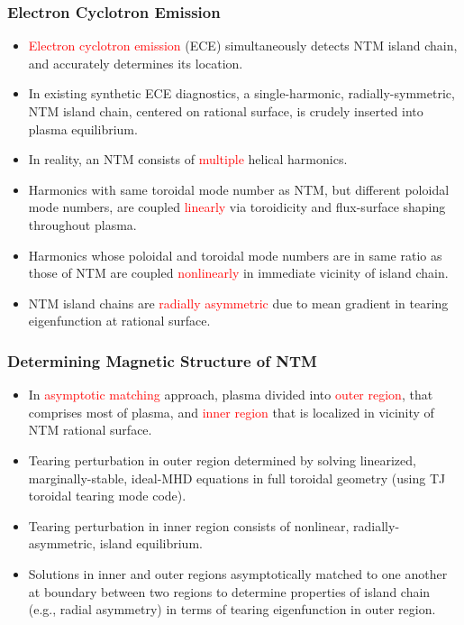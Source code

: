 \documentclass{beamer}
\begin{document}
\begin{frame}
\frametitle{Electron Cyclotron Emission}
 
\begin{itemize}
\item \textcolor{red}{Electron cyclotron emission} (ECE) simultaneously  detects  NTM island chain, and
accurately determines its location. 
\item In existing synthetic ECE diagnostics,  a single-harmonic, radially-symmetric, NTM island chain, centered on 
rational surface, is
crudely inserted into plasma equilibrium. 
\item In reality, an NTM consists of \textcolor{red}{multiple} helical harmonics. 
\item Harmonics with  same toroidal mode number as  NTM, but different poloidal mode numbers, are
coupled \textcolor{red}{linearly} via toroidicity and flux-surface shaping throughout  plasma. 
\item Harmonics whose poloidal and toroidal mode numbers are in  same ratio as those of  NTM are coupled \textcolor{red}{nonlinearly} in  immediate vicinity of island chain. 
\item NTM island chains are \textcolor{red}{radially asymmetric} due to mean gradient in tearing eigenfunction at rational surface. 
\end{itemize}
\end{frame}

\begin{frame}
\frametitle{Determining Magnetic Structure of NTM}
 
\begin{itemize}
\item  In \textcolor{red}{asymptotic matching} approach, plasma divided into \textcolor{red}{outer region}, that comprises most of plasma, and \textcolor{red}{inner region} that is localized in vicinity of NTM rational surface. 
\item Tearing perturbation in outer region determined by solving linearized, marginally-stable,  ideal-MHD  equations in full toroidal geometry (using TJ toroidal tearing mode code). 
\item Tearing perturbation in inner region consists of nonlinear, radially-asymmetric, island equilibrium.
\item Solutions in inner and outer regions asymptotically matched to one another at boundary between two regions to determine properties of island chain (e.g., radial asymmetry) in terms of
tearing eigenfunction in outer region. 
\end{itemize}

\end{frame}
\end{document}
